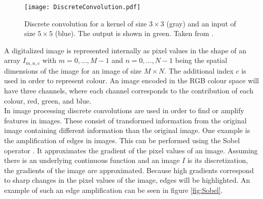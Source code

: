 \begin{figure}%
\centering
\texttt{[image: DiscreteConvolution.pdf]}
\caption{Discrete convolution for a kernel of size $3\times 3$ (gray) and an input of size $5\times 5$ (blue). The output is shown in green. Taken from \cite{RajaKishor2016}.}
\label{fig:Convolution}
\end{figure}

A digitalized image is represented internally as pixel values in the shape of an array $I_{m,n,c}$ with $m=0,\dots ,M-1$ and $n=0,\dots ,N-1$ being the spatial dimensions of the image for an image of size $M\times N$. The additional index $c$ is used in order to represent colour. An image encoded in the RGB colour space will have three channels, where each channel corresponds to the contribution of each colour, red, green, and blue. \\

In image processing discrete convolutions are used in order to find or amplify features in images. These consist of transformed information from the original image containing different information than the original image. One example is the amplification of edges in images. This can be performed using the Sobel operator \cite{Sobel1968}. It approximates the gradient of the pixel values of an image. Assuming there is an underlying continuous function and an image $I$ is its discretization, the gradients of the image are approximated. Because high gradients correspond to sharp changes in the pixel values of the image, edges will be highlighted. An example of such an edge amplification can be seen in figure \ref{fig:Sobel}.

